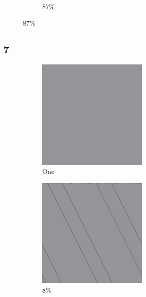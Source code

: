 \documentclass[12pt, fleqn]{report}                             %
\theoremstyle{break}                                            %
\begin{document}
\begin{figure}[ht!]
\begin{subfigure}[b]{0.4\linewidth}
          \caption{87\%}
        \end{subfigure}
      \end{figure}


      \clearpage
      \subsection{7}
      \begin{figure}[ht!]
        \centering
        \begin{subfigure}[b]{0.4\linewidth}
          \includegraphics[width=0.6\textwidth]{Images/7/a.png}
          \caption{One}
        \end{subfigure}
        \begin{subfigure}[b]{0.4\linewidth}
          \includegraphics[width=0.6\textwidth]{Images/7/b.png}
          \caption{8\%}
        \end{subfigure}
        \begin{subfigure}[b]{0.4\linewidth}

\end{subfigure}
\end{figure}
\end{document}
